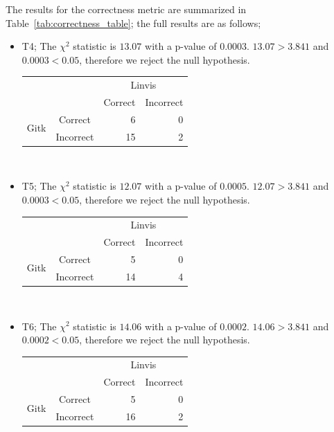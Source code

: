 The results for the correctness metric are summarized in
Table~\ref{tab:correctness_table}; the full results are as follows;


\begin{itemize}
  \item

    T4; The $\chi^2$ statistic is $13.07$ with a p-value of $0.0003$.
    $13.07 > 3.841$ and $0.0003 < 0.05$, therefore we reject the null
    hypothesis.

    \begin{tabular}{cc|rr}
                            &           & \multicolumn{2}{c}{Linvis}\\
                            &           & Correct                      & Incorrect\\\hline
      \multirow{2}{*}{Gitk} & Correct   & 6                            & 0\\
                            & Incorrect & 15                           & 2\\
    \end{tabular}\\

  \item

    T5; The $\chi^2$ statistic is $12.07$ with a p-value of $0.0005$.
    $12.07 > 3.841$ and $0.0003 < 0.05$, therefore we reject the null
    hypothesis.

    \begin{tabular}{cc|rr}
                            &           & \multicolumn{2}{c}{Linvis}\\
                            &           & Correct                      & Incorrect\\\hline
      \multirow{2}{*}{Gitk} & Correct   & 5                            & 0\\
                            & Incorrect & 14                           & 4\\
    \end{tabular}\\

  \item

    T6; The $\chi^2$ statistic is $14.06$ with a p-value of $0.0002$.
    $14.06 > 3.841$ and $0.0002 < 0.05$, therefore we reject the null
    hypothesis.

    \begin{tabular}{cc|rr}
                            &           & \multicolumn{2}{c}{Linvis}\\
                            &           & Correct                      & Incorrect\\\hline
      \multirow{2}{*}{Gitk} & Correct   & 5                            & 0\\
                            & Incorrect & 16                           & 2\\
    \end{tabular}


\end{itemize}
